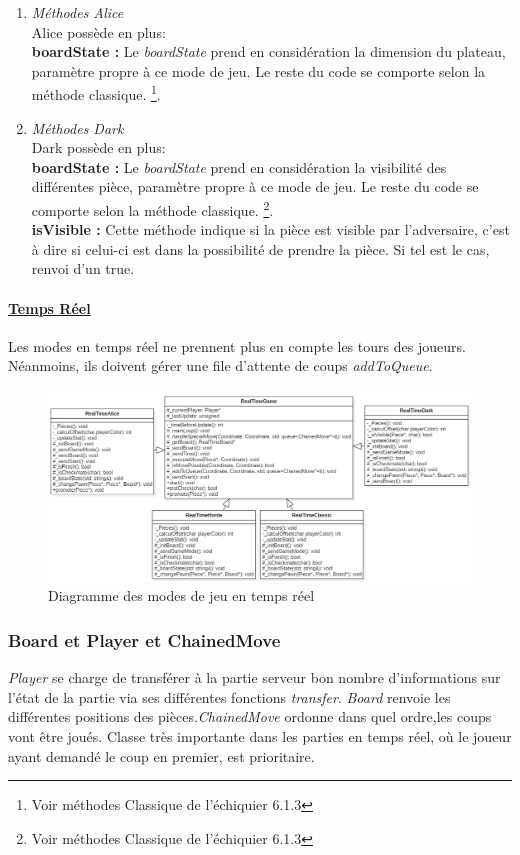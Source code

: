 \documentclass[10pt, a4paper]{article}
\begin{document}
\begin{enumerate}
\item \textit{Méthodes Alice} \\
Alice possède en plus:\\
\textbf{boardState :} Le \textit{boardState} prend en considération la dimension du plateau, paramètre propre à ce mode de jeu. Le reste du code se comporte selon la méthode classique. \footnote{Voir méthodes Classique de l'échiquier 6.1.3}. 

\item \textit{Méthodes Dark} \\
Dark possède en plus:\\
\textbf{boardState :}  Le \textit{boardState} prend en considération la visibilité des différentes pièce, paramètre propre à ce mode de jeu. Le reste du code se comporte selon la méthode classique. \footnote{Voir méthodes Classique de l'échiquier 6.1.3}. \\
\textbf{isVisible :} Cette méthode indique si la pièce est visible par l'adversaire, c'est à dire si celui-ci est dans la possibilité de prendre la pièce. Si tel est le cas, renvoi d'un true.
\end{enumerate}

\paragraph{\underline{Temps Réel}}
Les modes en temps réel ne prennent plus en compte les tours des joueurs. Néanmoins, ils doivent gérer une file d'attente de coups \textit{addToQueue}.
\begin{figure}[H]
\centering
\includegraphics[scale=0.5]{mode_chess_realtime.png}
\caption{Diagramme des modes de jeu en temps réel}
\end{figure}



\subsubsection{Board et Player et ChainedMove}
\textit{Player} se charge de transférer à la partie serveur bon nombre d'informations sur l'état de la partie via ses différentes fonctions \textit{transfer}. \textit{Board} renvoie les différentes positions des pièces.\textit{ChainedMove} ordonne dans quel ordre,les coups vont être joués. Classe très importante dans les parties en temps réel, où le joueur ayant demandé le coup en premier, est prioritaire.
\end{document}

